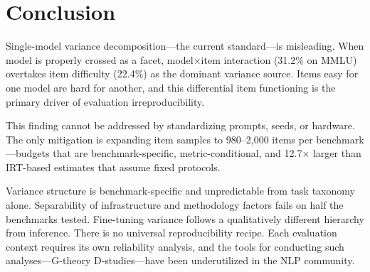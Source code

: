 \documentclass[11pt,twocolumn]{article}
\newcommand{\pct}{\%}
\begin{document}
\section{Conclusion}

Single-model variance decomposition---the current standard---is misleading. When model is properly crossed as a facet, model$\times$item interaction (31.2\pct{} on MMLU) overtakes item difficulty (22.4\pct{}) as the dominant variance source. Items easy for one model are hard for another, and this differential item functioning is the primary driver of evaluation irreproducibility.

This finding cannot be addressed by standardizing prompts, seeds, or hardware. The only mitigation is expanding item samples to 980--2{,}000 items per benchmark---budgets that are benchmark-specific, metric-conditional, and 12.7$\times$ larger than IRT-based estimates that assume fixed protocols.

Variance structure is benchmark-specific and unpredictable from task taxonomy alone. Separability of infrastructure and methodology factors fails on half the benchmarks tested. Fine-tuning variance follows a qualitatively different hierarchy from inference. There is no universal reproducibility recipe. Each evaluation context requires its own reliability analysis, and the tools for conducting such analyses---G-theory D-studies---have been underutilized in the NLP community.
\end{document}
